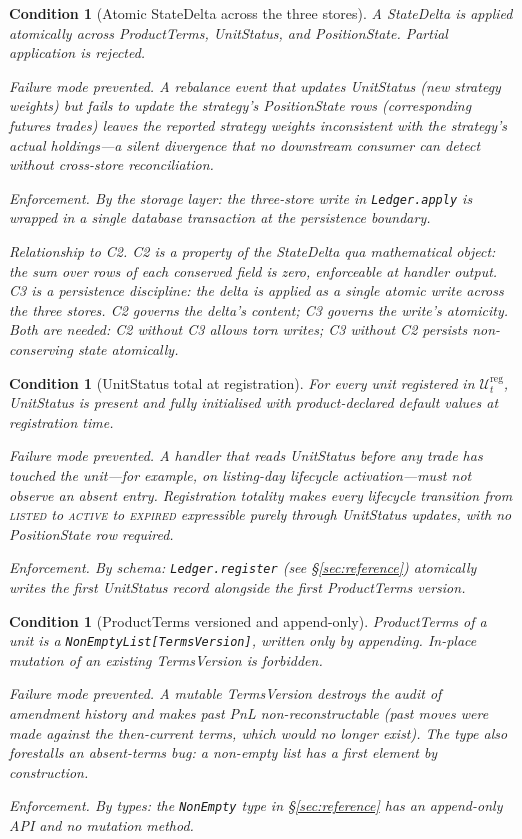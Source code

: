 \documentclass[11pt,a4paper]{article}
\newtheorem{condition}[definition]{Condition}
\begin{document}
\begin{condition}[Atomic StateDelta across the three stores]\label{cond:atomic}
A StateDelta is applied atomically across ProductTerms, UnitStatus, and PositionState. Partial application is rejected.

\emph{Failure mode prevented.} A rebalance event that updates UnitStatus (new strategy weights) but fails to update the strategy's PositionState rows (corresponding futures trades) leaves the reported strategy weights inconsistent with the strategy's actual holdings---a silent divergence that no downstream consumer can detect without cross-store reconciliation.

\emph{Enforcement.} By the storage layer: the three-store write in \texttt{Ledger.apply} is wrapped in a single database transaction at the persistence boundary.

\emph{Relationship to C2.} C2 is a property of the StateDelta qua mathematical object: the sum over rows of each conserved field is zero, enforceable at handler output. C3 is a persistence discipline: the delta is applied as a single atomic write across the three stores. C2 governs the delta's content; C3 governs the write's atomicity. Both are needed: C2 without C3 allows torn writes; C3 without C2 persists non-conserving state atomically.
\end{condition}

\begin{condition}[UnitStatus total at registration]\label{cond:unitstatusregistrationtotal}
For every unit registered in $\mathcal{U}_t^{\mathrm{reg}}$, UnitStatus is present and fully initialised with product-declared default values at registration time.

\emph{Failure mode prevented.} A handler that reads UnitStatus before any trade has touched the unit---for example, on listing-day lifecycle activation---must not observe an absent entry. Registration totality makes every lifecycle transition from \textsc{listed} to \textsc{active} to \textsc{expired} expressible purely through UnitStatus updates, with no PositionState row required.

\emph{Enforcement.} By schema: \texttt{Ledger.register} (see \S\ref{sec:reference}) atomically writes the first UnitStatus record alongside the first ProductTerms version.
\end{condition}

\begin{condition}[ProductTerms versioned and append-only]\label{cond:termsappendonly}
ProductTerms of a unit is a \texttt{NonEmptyList[TermsVersion]}, written only by appending. In-place mutation of an existing TermsVersion is forbidden.

\emph{Failure mode prevented.} A mutable TermsVersion destroys the audit of amendment history and makes past PnL non-reconstructable (past moves were made against the then-current terms, which would no longer exist). The type also forestalls an absent-terms bug: a non-empty list has a first element by construction.

\emph{Enforcement.} By types: the \texttt{NonEmpty} type in \S\ref{sec:reference} has an append-only API and no mutation method.
\end{condition}
\end{document}
